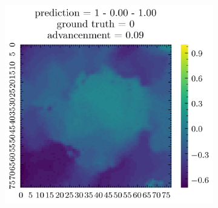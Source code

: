 \documentclass[../document.tex]{subfiles}
\begin{document}
\begin{figure}[H]
\begin{subfigure}[b]{0.19\textwidth}
    \end{subfigure}  
    \begin{subfigure}[b]{0.19\textwidth}
        \includegraphics[width=\linewidth]{../img/5/quarry/false_negative/patch-2d-4.png}
    \end{subfigure}  


\end{figure}
\end{document}
